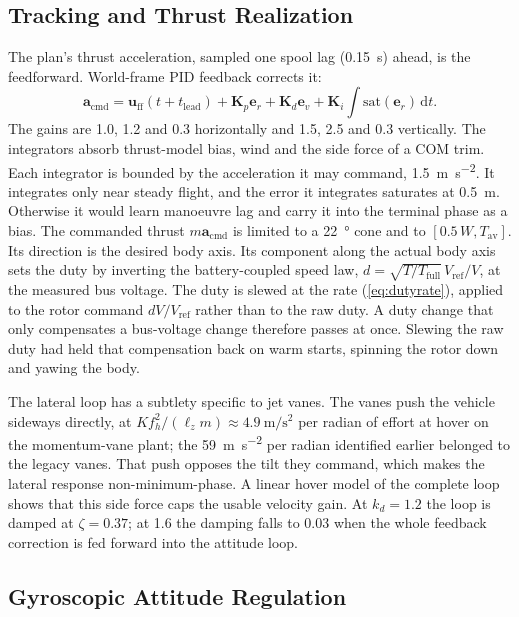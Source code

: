 \documentclass[journal]{IEEEtran}
\newcommand{\refeq}[1]{(\ref{#1})}
\newcommand{\vect}[1]{\bm{#1}}
\newcommand{\mat}[1]{\mathbf{#1}}
\begin{document}
\subsection{Tracking and Thrust Realization}
\label{sec:tracking}

The plan's thrust acceleration, sampled one spool lag (\SI{0.15}{\second}) ahead, is the feedforward.
World-frame PID feedback corrects it:
\begin{equation}
\vect{a}_{\text{cmd}} = \vect{u}_{\text{ff}}(t + t_{\text{lead}}) + \mat{K}_p\vect{e}_r + \mat{K}_d\vect{e}_v + \mat{K}_i\!\int\mathrm{sat}(\vect{e}_r)\,\mathrm{d}t .
\label{eq:track}
\end{equation}
The gains are 1.0, 1.2 and 0.3 horizontally and 1.5, 2.5 and 0.3 vertically.
The integrators absorb thrust-model bias, wind and the side force of a COM trim.
Each integrator is bounded by the acceleration it may command, \SI{1.5}{\metre\per\second\squared}.
It integrates only near steady flight, and the error it integrates saturates at \SI{0.5}{\metre}.
Otherwise it would learn manoeuvre lag and carry it into the terminal phase as a bias.
The commanded thrust $m\vect{a}_{\text{cmd}}$ is limited to a \SI{22}{\degree} cone and to $[0.5\,W, T_{\text{av}}]$.
Its direction is the desired body axis.
Its component along the actual body axis sets the duty by inverting the battery-coupled speed law, $d = \sqrt{T/T_{\text{full}}}\,V_{\text{ref}}/V$, at the measured bus voltage.
The duty is slewed at the rate \refeq{eq:dutyrate}, applied to the rotor command $dV/V_{\text{ref}}$ rather than to the raw duty.
A duty change that only compensates a bus-voltage change therefore passes at once.
Slewing the raw duty had held that compensation back on warm starts, spinning the rotor down and yawing the body.

The lateral loop has a subtlety specific to jet vanes.
The vanes push the vehicle sideways directly, at $Kf_h^2/(\ell_z m) \approx \SI{4.9}{\metre\per\second\squared}$ per radian of effort at hover on the momentum-vane plant; the \SI{59}{\metre\per\second\squared} per radian identified earlier belonged to the legacy vanes.
That push opposes the tilt they command, which makes the lateral response non-minimum-phase.
A linear hover model of the complete loop shows that this side force caps the usable velocity gain.
At $k_d = 1.2$ the loop is damped at $\zeta = 0.37$; at 1.6 the damping falls to 0.03 when the whole feedback correction is fed forward into the attitude loop.

\subsection{Gyroscopic Attitude Regulation}
\label{sec:lqr}
\end{document}
